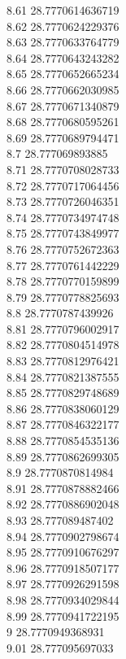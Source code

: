 {8.61	28.7770614636719\\
8.62	28.7770624229376\\
8.63	28.7770633764779\\
8.64	28.7770643243282\\
8.65	28.7770652665234\\
8.66	28.7770662030985\\
8.67	28.7770671340879\\
8.68	28.7770680595261\\
8.69	28.7770689794471\\
8.7	28.777069893885\\
8.71	28.7770708028733\\
8.72	28.7770717064456\\
8.73	28.7770726046351\\
8.74	28.7770734974748\\
8.75	28.7770743849977\\
8.76	28.7770752672363\\
8.77	28.7770761442229\\
8.78	28.7770770159899\\
8.79	28.7770778825693\\
8.8	28.7770787439926\\
8.81	28.7770796002917\\
8.82	28.7770804514978\\
8.83	28.7770812976421\\
8.84	28.7770821387555\\
8.85	28.7770829748689\\
8.86	28.7770838060129\\
8.87	28.7770846322177\\
8.88	28.7770854535136\\
8.89	28.7770862699305\\
8.9	28.7770870814984\\
8.91	28.7770878882466\\
8.92	28.7770886902048\\
8.93	28.777089487402\\
8.94	28.7770902798674\\
8.95	28.7770910676297\\
8.96	28.7770918507177\\
8.97	28.7770926291598\\
8.98	28.7770934029844\\
8.99	28.7770941722195\\
9	28.7770949368931\\
9.01	28.777095697033\\
}
